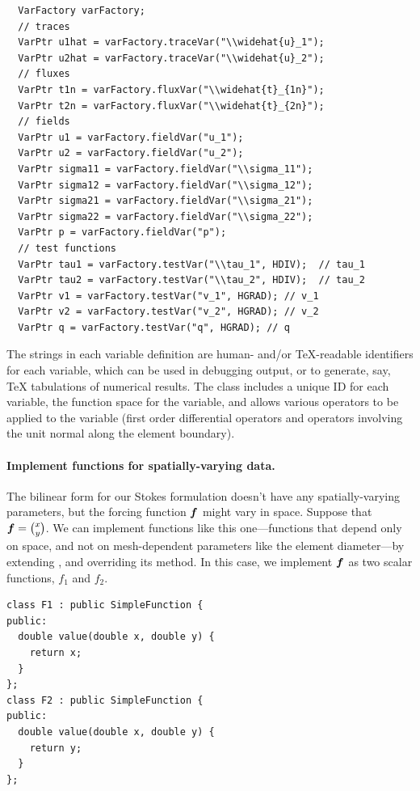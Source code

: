 \begin{lstlisting}
  VarFactory varFactory; 
  // traces
  VarPtr u1hat = varFactory.traceVar("\\widehat{u}_1");
  VarPtr u2hat = varFactory.traceVar("\\widehat{u}_2");
  // fluxes
  VarPtr t1n = varFactory.fluxVar("\\widehat{t}_{1n}");
  VarPtr t2n = varFactory.fluxVar("\\widehat{t}_{2n}");
  // fields
  VarPtr u1 = varFactory.fieldVar("u_1");
  VarPtr u2 = varFactory.fieldVar("u_2");
  VarPtr sigma11 = varFactory.fieldVar("\\sigma_11");
  VarPtr sigma12 = varFactory.fieldVar("\\sigma_12");
  VarPtr sigma21 = varFactory.fieldVar("\\sigma_21");
  VarPtr sigma22 = varFactory.fieldVar("\\sigma_22");
  VarPtr p = varFactory.fieldVar("p");
  // test functions
  VarPtr tau1 = varFactory.testVar("\\tau_1", HDIV);  // tau_1
  VarPtr tau2 = varFactory.testVar("\\tau_2", HDIV);  // tau_2
  VarPtr v1 = varFactory.testVar("v_1", HGRAD); // v_1
  VarPtr v2 = varFactory.testVar("v_2", HGRAD); // v_2
  VarPtr q = varFactory.testVar("q", HGRAD); // q
\end{lstlisting}

The strings in each variable definition are human- and/or TeX-readable identifiers for each variable, which can be used in debugging output, or to generate, say, TeX tabulations of numerical results.  The  class includes a unique ID for each variable, the function space for the variable, and allows various operators to be applied to the variable (first order differential operators and operators involving the unit normal along the element boundary).

\paragraph{Implement functions for spatially-varying data.}
The bilinear form for our Stokes formulation doesn't have any spatially-varying parameters, but the forcing function $\vect{f}$ might vary in space.  Suppose that $\vect{f}= {x \choose y}$.  We can implement functions like this one---functions that depend only on space, and not on mesh-dependent parameters like the element diameter---by extending , and overriding its  method.  In this case, we implement $\vect{f}$ as two scalar functions, $f_{1}$ and $f_{2}$.
\begin{lstlisting}
class F1 : public SimpleFunction {
public:
  double value(double x, double y) {
    return x;
  }
};
class F2 : public SimpleFunction {
public:
  double value(double x, double y) {
    return y;
  }
};
\end{lstlisting}

